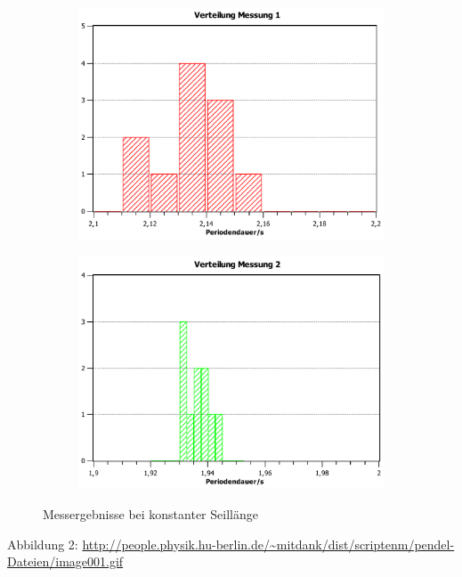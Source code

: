 \documentclass[11pt,a4paper,titlepage, ngerman]{article}
\begin{document}
			\begin{figure}[ht]
				\begin{subfigure}{0.5\textwidth}
					\centering
					\includegraphics[scale=0.35]{VerteilungMessung1.pdf}
				\end{subfigure}
				\begin{subfigure}{0.5\textwidth}
					\centering
					\includegraphics[scale=0.35]{VerteilungMessung2.pdf}
				\end{subfigure}		
				\caption{Messergebnisse bei konstanter Seillänge}
				\label{fig:seilKonst}
			\end{figure}
		
		\begin{thebibliography}{9}		
			\item[Abbildung 2:] \url{http://people.physik.hu-berlin.de/~mitdank/dist/scriptenm/pendel-Dateien/image001.gif}			
		\end{thebibliography}	
			
\end{document}
